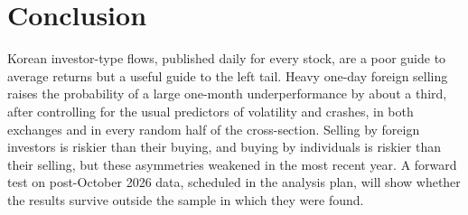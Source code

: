 \documentclass[11pt]{article}
\begin{document}
\section{Conclusion}\label{sec:conclusion}
Korean investor-type flows, published daily for every stock, are a poor guide to average returns but a useful guide
to the left tail. Heavy one-day foreign selling raises the probability of a large one-month underperformance by about a
third, after controlling for the usual predictors of volatility and crashes, in both exchanges and in every random half
of the cross-section. Selling by foreign investors is riskier than their buying, and buying by individuals is riskier
than their selling, but these asymmetries weakened in the most recent year. A forward test on post-October 2026 data,
scheduled in the analysis plan, will show whether the results survive outside the sample in which they were found.
\end{document}
